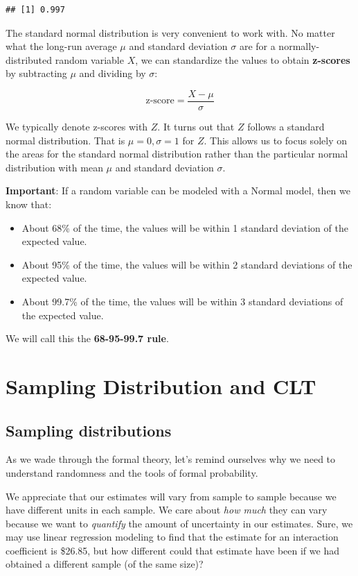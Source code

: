 \documentclass[]{book}
\providecommand{\tightlist}{%
  \setlength{\itemsep}{0pt}\setlength{\parskip}{0pt}}
\begin{document}
\begin{verbatim}
## [1] 0.997
\end{verbatim}

The standard normal distribution is very convenient to work with. No matter what the long-run average \(\mu\) and standard deviation \(\sigma\) are for a normally-distributed random variable \(X\), we can standardize the values to obtain \textbf{z-scores} by subtracting \(\mu\) and dividing by \(\sigma\):

\[\text{z-score} = \frac{X - \mu}{\sigma}\]

We typically denote z-scores with \(Z\). It turns out that \(Z\) follows a standard normal distribution. That is \(\mu=0, \sigma=1\) for \(Z\). This allows us to focus solely on the areas for the standard normal distribution rather than the particular normal distribution with mean \(\mu\) and standard deviation \(\sigma\).

\textbf{Important}: If a random variable can be modeled with a Normal model, then we know that:

\begin{itemize}
\tightlist
\item
  About 68\% of the time, the values will be within 1 standard deviation of the expected value.
\item
  About 95\% of the time, the values will be within 2 standard deviations of the expected value.
\item
  About 99.7\% of the time, the values will be within 3 standard deviations of the expected value.
\end{itemize}

We will call this the \textbf{68-95-99.7 rule}.

\hypertarget{sampling-distribution-and-clt}{%
\section{Sampling Distribution and CLT}\label{sampling-distribution-and-clt}}

\hypertarget{sampling-distributions}{%
\subsection{Sampling distributions}\label{sampling-distributions}}

As we wade through the formal theory, let's remind ourselves why we need to understand randomness and the tools of formal probability.

We appreciate that our estimates will vary from sample to sample because we have different units in each sample. We care about \emph{how much} they can vary because we want to \emph{quantify} the amount of uncertainty in our estimates. Sure, we may use linear regression modeling to find that the estimate for an interaction coefficient is \$26.85, but how different could that estimate have been if we had obtained a different sample (of the same size)?
\end{document}
